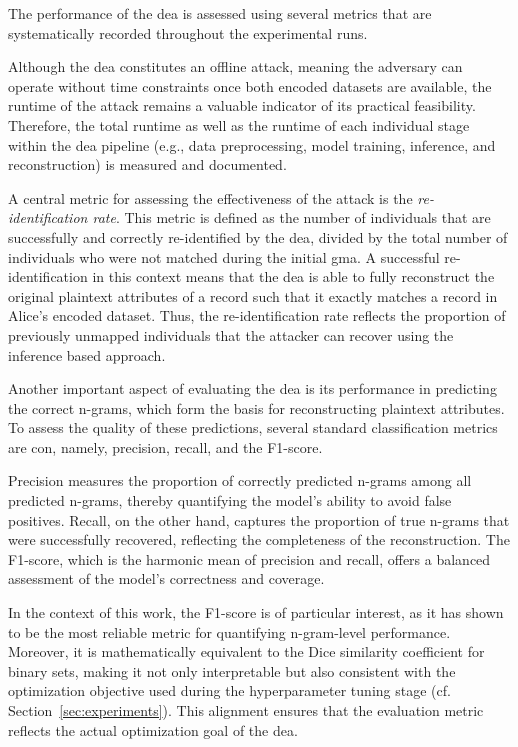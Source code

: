 The performance of the \ac{dea} is assessed using several metrics that are systematically recorded throughout the experimental runs.

Although the \ac{dea} constitutes an offline attack, meaning the adversary can operate without time constraints once both encoded datasets are available, the runtime of the attack remains a valuable indicator of its practical feasibility.
Therefore, the total runtime as well as the runtime of each individual stage within the \ac{dea} pipeline (e.g., data preprocessing, model training, inference, and reconstruction) is measured and documented.

A central metric for assessing the effectiveness of the attack is the \emph{re-identification rate}.
This metric is defined as the number of individuals that are successfully and correctly re-identified by the \ac{dea}, divided by the total number of individuals who were not matched during the initial \ac{gma}.
A successful re-identification in this context means that the \ac{dea} is able to fully reconstruct the original plaintext attributes of a record such that it exactly matches a record in Alice's encoded dataset.
Thus, the re-identification rate reflects the proportion of previously unmapped individuals that the attacker can recover using the inference based approach.

Another important aspect of evaluating the \ac{dea} is its performance in predicting the correct n-grams, which form the basis for reconstructing plaintext attributes.
To assess the quality of these predictions, several standard classification metrics are con, namely, precision, recall, and the F1-score.

Precision measures the proportion of correctly predicted n-grams among all predicted n-grams, thereby quantifying the model’s ability to avoid false positives.
Recall, on the other hand, captures the proportion of true n-grams that were successfully recovered, reflecting the completeness of the reconstruction.
The F1-score, which is the harmonic mean of precision and recall, offers a balanced assessment of the model's correctness and coverage.

In the context of this work, the F1-score is of particular interest, as it has shown to be the most reliable metric for quantifying n-gram-level performance.
Moreover, it is mathematically equivalent to the Dice similarity coefficient for binary sets, making it not only interpretable but also consistent with the optimization objective used during the hyperparameter tuning stage (cf. Section~\ref{sec:experiments}).
This alignment ensures that the evaluation metric reflects the actual optimization goal of the \ac{dea}.

